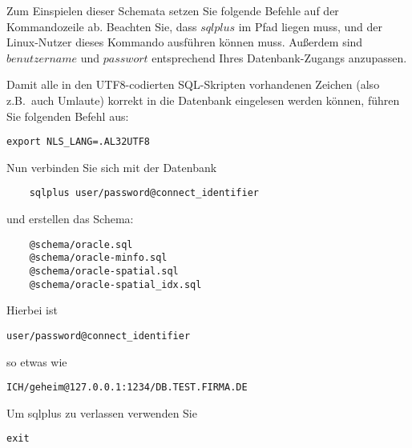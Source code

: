Zum Einspielen dieser Schemata setzen Sie folgende Befehle auf der Kommandozeile
ab. Beachten Sie, dass $sqlplus$ im Pfad liegen muss, und der Linux-Nutzer
dieses Kommando ausführen können muss. Außerdem sind $benutzername$ und $passwort$
entsprechend Ihres Datenbank-Zugangs anzupassen.

Damit alle in den UTF8-codierten SQL-Skripten vorhandenen Zeichen (also z.B.\
auch Umlaute) korrekt in die Datenbank eingelesen werden können, führen
Sie folgenden Befehl aus:

\begin{lstlisting}
export NLS_LANG=.AL32UTF8
\end{lstlisting}

Nun verbinden Sie sich mit der Datenbank
\begin{lstlisting}
    sqlplus user/password@connect_identifier
\end{lstlisting}

und erstellen das Schema:

\begin{lstlisting}
    @schema/oracle.sql
    @schema/oracle-minfo.sql
    @schema/oracle-spatial.sql
    @schema/oracle-spatial_idx.sql
\end{lstlisting}

Hierbei ist
\begin{lstlisting}
user/password@connect_identifier
\end{lstlisting}
so etwas wie
\begin{lstlisting}
ICH/geheim@127.0.0.1:1234/DB.TEST.FIRMA.DE
\end{lstlisting}

Um sqlplus zu verlassen verwenden Sie
\begin{lstlisting}
exit
\end{lstlisting}
